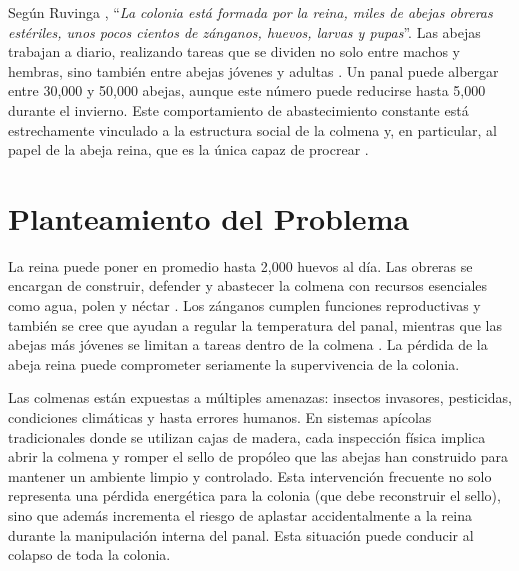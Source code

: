 \documentclass[12pt]{report}
\begin{document}
\par Según Ruvinga \cite{ruvinga2021use}, ``\textit{La colonia está formada por la reina, miles de abejas obreras estériles, unos pocos cientos de zánganos, huevos, larvas y pupas}''. Las abejas trabajan a diario, realizando tareas que se dividen no solo entre machos y hembras, sino también entre abejas jóvenes y adultas \cite{johnson2010division}. Un panal puede albergar entre 30,000 y 50,000 abejas, aunque este número puede reducirse hasta 5,000 durante el invierno. Este comportamiento de abastecimiento constante está estrechamente vinculado a la estructura social de la colmena y, en particular, al papel de la abeja reina, que es la única capaz de procrear \cite{ruvinga2021use}.


\section{Planteamiento del Problema}

La reina puede poner en promedio hasta 2,000 huevos al día. Las obreras se encargan de construir, defender y abastecer la colmena con recursos esenciales como agua, polen y néctar \cite{winston1987temperate}. Los zánganos cumplen funciones reproductivas y también se cree que ayudan a regular la temperatura del panal, mientras que las abejas más jóvenes se limitan a tareas dentro de la colmena \cite{johnson2010division}. La pérdida de la abeja reina puede comprometer seriamente la supervivencia de la colonia.

\par Las colmenas están expuestas a múltiples amenazas: insectos invasores, pesticidas, condiciones climáticas y hasta errores humanos. En sistemas apícolas tradicionales donde se utilizan cajas de madera, cada inspección física implica abrir la colmena y romper el sello de propóleo que las abejas han construido para mantener un ambiente limpio y controlado. Esta intervención frecuente no solo representa una pérdida energética para la colonia (que debe reconstruir el sello), sino que además incrementa el riesgo de aplastar accidentalmente a la reina durante la manipulación interna del panal. Esta situación puede conducir al colapso de toda la colonia.

\end{document}
